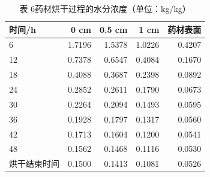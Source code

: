 \begin{table}[H]
\centering
\caption{表 6\quad 药材烘干过程的水分浓度（单位：kg/kg）}
\label{tab:p4C}
\footnotesize
\begin{tabular}{@{}lrrrr@{}}
\toprule
时间/h & 0 cm & 0.5 cm & 1 cm & 药材表面 \\
\midrule
6 & 1.7196 & 1.5378 & 1.0226 & 0.4207 \\
12 & 0.7378 & 0.6547 & 0.4084 & 0.1670 \\
18 & 0.4088 & 0.3687 & 0.2398 & 0.0892 \\
24 & 0.2852 & 0.2611 & 0.1790 & 0.0673 \\
30 & 0.2264 & 0.2094 & 0.1493 & 0.0595 \\
36 & 0.1928 & 0.1797 & 0.1317 & 0.0560 \\
42 & 0.1713 & 0.1604 & 0.1200 & 0.0541 \\
48 & 0.1562 & 0.1468 & 0.1116 & 0.0530 \\
烘干结束时间 & 0.1500 & 0.1413 & 0.1081 & 0.0526 \\
\bottomrule
\end{tabular}
\end{table}
